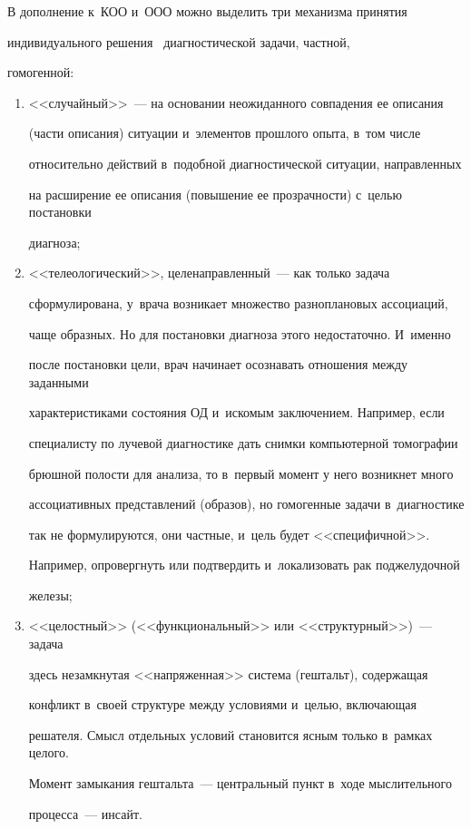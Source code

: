   В дополнение к~КОО и~ООО можно выделить три механизма принятия 

индивидуального решения~\cite{9-rum} диагностической задачи, частной, 

гомогенной:

  \begin{enumerate}[(1)]

\item <<случайный>>~--- на основании неожиданного совпадения ее описания 

(части описания) ситуации и~элементов прошлого опыта, в~том числе 

относительно действий в~подобной диагностической ситуации, направленных 

на расширение ее описания (повышение ее прозрачности) с~целью постановки 

диагноза; 

\item <<телеологический>>, целенаправленный~--- как только задача 

сформулирована, у~врача возникает множество разноплановых ассоциаций, 

чаще образных. Но для постановки диагноза этого недостаточно. И~именно 

после постановки цели, врач начинает осознавать отношения между заданными 

характеристиками состояния ОД и~искомым заключением. Например, если 

специалисту по лучевой диагностике дать снимки компьютерной томографии 

брюшной полости для анализа, то в~первый момент у него возникнет много 

ассоциативных представлений (образов), но гомогенные задачи в~диагностике 

так не формулируются, они частные, и~цель будет <<специфичной>>. 

Например, опровергнуть или подтвердить и~локализовать рак поджелудочной 

железы; 

\item <<целостный>> (<<функциональный>> или <<структурный>>)~--- задача 

здесь не\-замк\-ну\-тая <<напряженная>> система (гештальт), содержащая 

конфликт в~своей структуре между условиями и~целью, включающая 

решателя. Смысл отдельных условий становится ясным только в~рамках целого. 

Момент замыкания гештальта~--- центральный пункт в~ходе мыслительного 

процесса~--- инсайт. 

  \end{enumerate}

